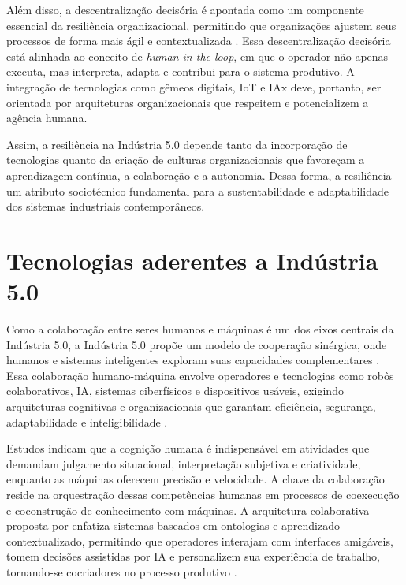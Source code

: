 Além disso, a descentralização decisória é apontada como um componente essencial da resiliência organizacional, permitindo que organizações ajustem seus processos de forma mais ágil e contextualizada \cite{PIZON2023, Nahavandi2019}.
Essa descentralização decisória está alinhada ao conceito de \textit{human-in-the-loop}, em que o operador não apenas executa, mas interpreta, adapta e contribui para o sistema produtivo. A integração de tecnologias como gêmeos digitais, \gls{IoT} e \gls{IAx} deve, portanto, ser orientada por arquiteturas organizacionais que respeitem e potencializem a agência humana.

Assim, a resiliência na Indústria 5.0 depende tanto da incorporação de tecnologias quanto da criação de culturas organizacionais que favoreçam a aprendizagem contínua, a colaboração e a autonomia.
Dessa forma, a resiliência um atributo sociotécnico fundamental para a sustentabilidade e adaptabilidade dos sistemas industriais contemporâneos.

\section{Tecnologias aderentes a Indústria 5.0}

Como a colaboração entre seres humanos e máquinas é um dos eixos centrais da Indústria 5.0,  a Indústria 5.0 propõe um modelo de cooperação sinérgica, onde humanos e sistemas inteligentes exploram suas capacidades complementares \cite{Nahavandi2019, Santana_2023}.
Essa colaboração humano-máquina envolve operadores e tecnologias como robôs colaborativos, \gls{IA}, sistemas ciberfísicos e dispositivos usáveis, exigindo arquiteturas cognitivas e organizacionais que garantam eficiência, segurança, adaptabilidade e inteligibilidade \cite{TOTH2023, PIZON2023}.

Estudos indicam que a cognição humana é indispensável em atividades que demandam julgamento situacional, interpretação subjetiva e criatividade, enquanto as máquinas oferecem precisão e velocidade.
A chave da colaboração reside na orquestração dessas competências humanas em processos de coexecução e coconstrução de conhecimento \cite{TOTH2023} com máquinas.
A arquitetura colaborativa proposta por  enfatiza sistemas baseados em ontologias e aprendizado contextualizado, permitindo que operadores interajam com interfaces amigáveis, tomem decisões assistidas por \gls{IA} e personalizem sua experiência de trabalho, tornando-se cocriadores no processo produtivo \cite{TOTH2023, YANG2024}.

